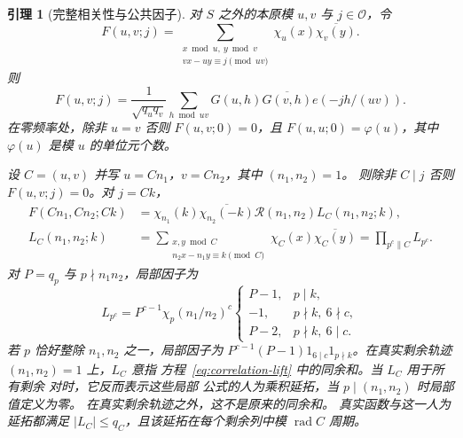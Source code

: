 \documentclass[11pt,a4paper]{article}
\numberwithin{equation}{section}
\numberwithin{figure}{section}
\newtheorem{lemma}[theorem]{引理}
\theoremstyle{definition}
\theoremstyle{remark}
\begin{document}
\begin{lemma}[完整相关性与公共因子]\label{lem:full-correlation}
对 $S$ 之外的本原模 $u,v$ 与 $j\in\mathcal O$，令
\begin{equation}
 F(u,v;j)
 =\sum_{\substack{x\bmod u,\ y\bmod v\\
                    vx-uy\equiv j\pmod{uv}}}
       \chi_u(x)\overline{\chi_v(y)}.
 \label{old-eq:2.11}
\end{equation}
则
\[
 F(u,v;j)=\frac1{\sqrt{q_uq_v}}\sum_{h\bmod uv}
 G(u,h)\overline{G(v,h)}e(-jh/(uv)).
\]
在零频率处，除非 $u=v$ 否则 $F(u,v;0)=0$，且
$F(u,u;0)=\varphi(u)$，其中 $\varphi(u)$ 是模 $u$ 的单位元个数。

设 $C=(u,v)$ 并写 $u=Cn_1$，$v=Cn_2$，其中 $(n_1,n_2)=1$。
则除非 $C\mid j$ 否则 $F(u,v;j)=0$。对 $j=Ck$，
\begin{equation}
 \begin{aligned}
 F(Cn_1,Cn_2;Ck)
 &=\chi_{n_1}(k)\overline{\chi_{n_2}(-k)}
      \mathcal R(n_1,n_2)L_C(n_1,n_2;k),\\
 L_C(n_1,n_2;k)
 &=\sum_{\substack{x,y\bmod C\\n_2x-n_1y\equiv k\pmod C}}
       \chi_C(x)\overline{\chi_C(y)}
   =\prod_{p^c\parallel C}L_{p^c}.
 \end{aligned}
 \label{eq:correlation-lift}
\end{equation}
对 $P=q_p$ 与 $p\nmid n_1n_2$，局部因子为
\begin{equation}
 L_{p^c}=P^{c-1}\chi_p(n_1/n_2)^c
 \begin{cases}
 P-1,&p\mid k,\\
 -1,&p\nmid k,\ 6\nmid c,\\
 P-2,&p\nmid k,\ 6\mid c.
 \end{cases}
 \label{eq:correlation-local}
\end{equation}
若 $p$ 恰好整除 $n_1,n_2$ 之一，局部因子为
$P^{c-1}(P-1)1_{6\mid c}1_{p\nmid k}$。在真实剩余轨迹
$(n_1,n_2)=1$ 上，$L_C$ 意指
方程~\eqref{eq:correlation-lift} 中的同余和。当 $L_C$ 用于所有剩余
对时，它反而表示这些局部
公式的人为乘积延拓，当 $p\mid(n_1,n_2)$ 时局部值定义为零。
在真实剩余轨迹之外，这不是原来的同余和。
真实函数与这一人为延拓都满足
$|L_C|\le q_C$，且该延拓在每个剩余列中模
$\operatorname{rad}C$ 周期。
\end{lemma}
\end{document}
